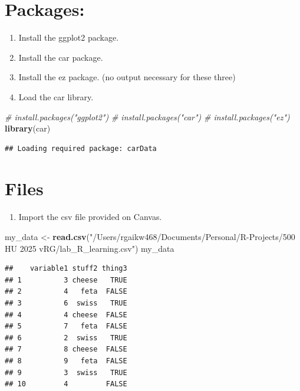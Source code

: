 \documentclass[
]{article}
\newenvironment{Shaded}{\begin{snugshade}}{\end{snugshade}}
\newcommand{\CommentTok}[1]{\textcolor[rgb]{0.56,0.35,0.01}{\textit{#1}}}
\newcommand{\FunctionTok}[1]{\textcolor[rgb]{0.13,0.29,0.53}{\textbf{#1}}}
\newcommand{\NormalTok}[1]{#1}
\newcommand{\OtherTok}[1]{\textcolor[rgb]{0.56,0.35,0.01}{#1}}
\newcommand{\StringTok}[1]{\textcolor[rgb]{0.31,0.60,0.02}{#1}}
\providecommand{\tightlist}{%
  \setlength{\itemsep}{0pt}\setlength{\parskip}{0pt}}
\begin{document}
\section{Packages:}\label{packages}

\begin{enumerate}
\def\labelenumi{\arabic{enumi}.}
\setcounter{enumi}{25}
\tightlist
\item
  Install the ggplot2 package.
\item
  Install the car package.
\item
  Install the ez package. (no output necessary for these three)
\item
  Load the car library.
\end{enumerate}

\begin{Shaded}
\begin{Highlighting}[]
\CommentTok{\# install.packages("ggplot2")}
\CommentTok{\# install.packages("car")}
\CommentTok{\# install.packages("ez")}
\FunctionTok{library}\NormalTok{(car)}
\end{Highlighting}
\end{Shaded}

\begin{verbatim}
## Loading required package: carData
\end{verbatim}

\section{Files}\label{files}

\begin{enumerate}
\def\labelenumi{\arabic{enumi}.}
\setcounter{enumi}{29}
\tightlist
\item
  Import the csv file provided on Canvas.
\end{enumerate}

\begin{Shaded}
\begin{Highlighting}[]
\NormalTok{my\_data }\OtherTok{\textless{}{-}} \FunctionTok{read.csv}\NormalTok{(}\StringTok{"/Users/rgaikw468/Documents/Personal/R{-}Projects/500 HU 2025 vRG/lab\_R\_learning.csv"}\NormalTok{)}
\NormalTok{my\_data}
\end{Highlighting}
\end{Shaded}

\begin{verbatim}
##    variable1 stuff2 thing3
## 1          3 cheese   TRUE
## 2          4   feta  FALSE
## 3          6  swiss   TRUE
## 4          4 cheese  FALSE
## 5          7   feta  FALSE
## 6          2  swiss   TRUE
## 7          8 cheese  FALSE
## 8          9   feta  FALSE
## 9          3  swiss   TRUE
## 10         4         FALSE
\end{verbatim}
\end{document}
